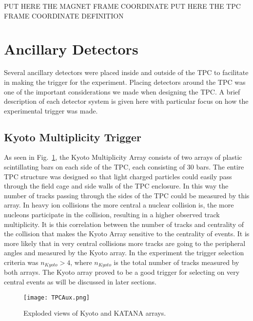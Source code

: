 PUT HERE THE MAGNET FRAME COORDINATE 
PUT HERE THE TPC FRAME COORDINATE DEFINITION 



\section{Ancillary Detectors }
Several ancillary detectors were placed inside and outside of the \spirit TPC to facilitate in making the trigger for the experiment. Placing detectors around the TPC was one of the important considerations we made when designing the TPC. A brief description of each detector system is given here with particular focus on how the experimental trigger was made. 

\subsection{Kyoto Multiplicity Trigger}
As seen in Fig.~\ref{fig:aux}, the Kyoto Multiplicity Array consists of two arrays of plastic scintillating bars on each side of the TPC, each consisting of 30 bars. The entire TPC structure was designed so that light charged particles could easily pass through the field cage and side walls of the TPC enclosure. In this way the number of tracks passing through the sides of the TPC could be measured by this array. In heavy ion collisions the more central a nuclear collision is, the more nucleons participate in the collision, resulting in a higher observed track multiplicity. It is this correlation between the number of tracks and centrality of the collision that makes the Kyoto Array sensitive to the centrality of events. It is more likely that in very central collisions more tracks are going to the peripheral angles and measured by the Kyoto array. In the experiment the trigger selection criteria was $n_{Kyoto} > 4$, where $n_{Kyoto}$ is the total number of tracks measured by both arrays. The Kyoto array proved to be a good trigger for selecting on very central events as will be discussed in later sections. 

\begin{figure}[!htb]
\texttt{[image: TPCAux.png]}
\label{fig:aux}
\caption{Exploded views of Kyoto and KATANA arrays.}
\end{figure}


